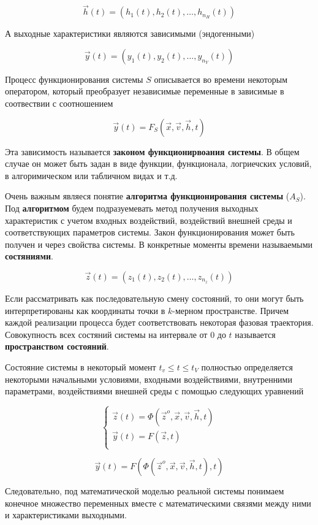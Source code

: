 \begin{equation*}
    \vec h(t) = \left( h_1(t), h_2(t), \ldots, h_{n_H}(t) \right)
\end{equation*}

А выходные характеристики являются зависимыми (эндогенными)

\begin{equation*}
    \vec y(t) = \left( y_1(t), y_2(t), \ldots, y_{n_Y}(t) \right)
\end{equation*}

Процесс функционирования системы $S$ описывается во времени некоторым оператором, который преобразует независимые переменные в зависимые в соотвествии с соотношением

\begin{equation*}
    \vec y (t) = F_S (\vec x, \vec v, \vec h, t )
\end{equation*}

Эта зависимость называется \textbf{законом функционирвоания системы}. В общем случае он может быть задан в виде функции, функционала, логриечских условий, в алгоримическом или табличном видах и т.д.

Очень важным являеся понятие \textbf{алгоритма функционирования системы} ($A_S$). Под \textbf{алгоритмом} будем подразуемевать метод получения выходных характеристик с учетом входных воздействий, воздействий внешней среды и соответствующих параметров системы. Закон функционирования может быть получен и через свойства системы. В конкретные моменты времени называемыми \textbf{состяниями}.

\begin{equation*}
    \vec z (t) = \left( z_1 (t), z_2(t), \ldots, z_{n_z}(t) \right)
\end{equation*}

Если рассматривать как последовательную смену состояний, то они могут быть интерпретированы как координаты точки в $k$-мерном пространстве. Причем каждой реализации процесса будет соответствовать некоторая фазовая траектория. Совокупность всех состяний системы на интервале от 0 до $t$ называется \textbf{пространством состояний}.

Состояние системы в некоторый момент $t_v \le t \le t_V$ полностью определяется некоторыми начальными условиями, входными воздействиями, внутренними параметрами, воздействиями внешней среды с помощью следующих уравнений

\begin{equation*}
    \begin{cases}
        \vec z (t) = \Phi ( \vec z^o, \vec x, \vec v, \vec h, t) \\
        \vec y(t) = F(\vec z, t) \\
    \end{cases}
\end{equation*}

\begin{equation*}
    \vec y(t) = F(\Phi ( \vec z^o, \vec x, \vec v, \vec h, t), t)
\end{equation*}

Следовательно, под математической моделью реальной системы понимаем конечное множество переменных вместе с математическими связями между ними и характеристиками выходными.
